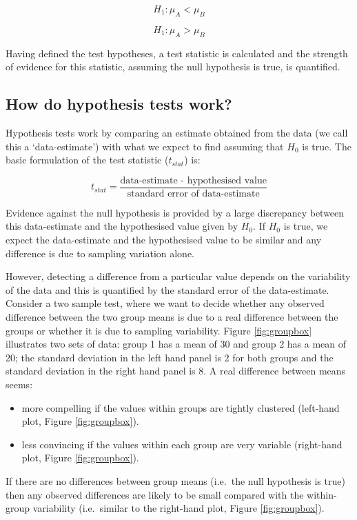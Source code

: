 \documentclass[
  oneside]{krantz}
\begin{document}
\[H_1: \mu_A < \mu_B\]

\[H_1: \mu_A > \mu_B\]

Having defined the test hypotheses, a test statistic is calculated and the strength of evidence for this statistic, assuming the null hypothesis is true, is quantified.

\hypertarget{how-do-hypothesis-tests-work}{%
\subsection{How do hypothesis tests work?}\label{how-do-hypothesis-tests-work}}

Hypothesis tests work by comparing an estimate obtained from the data (we call this a `data-estimate') with what we expect to find assuming that \(H_0\) is true. The basic formulation of the test statistic (\(t_{stat}\)) is:

\[t_{stat}=\frac{\textrm{data-estimate - hypothesised value}}{\textrm{standard error of data-estimate}}\]

Evidence against the null hypothesis is provided by a large discrepancy between this data-estimate and the hypothesised value given by \(H_0\). If \(H_0\) is true, we expect the data-estimate and the hypothesised value to be similar and any difference is due to sampling variation alone.

However, detecting a difference from a particular value depends on the variability of the data and this is quantified by the standard error of the data-estimate. Consider a two sample test, where we want to decide whether any observed difference between the two group means is due to a real difference between the groups or whether it is due to sampling variability. Figure \ref{fig:groupbox} illustrates two sets of data: group 1 has a mean of 30 and group 2 has a mean of 20; the standard deviation in the left hand panel is 2 for both groups and the standard deviation in the right hand panel is 8. A real difference between means seems:

\begin{itemize}
\item
  more compelling if the values within groups are tightly clustered (left-hand plot, Figure \ref{fig:groupbox}).
\item
  less convincing if the values within each group are very variable (right-hand plot, Figure \ref{fig:groupbox}).
\end{itemize}

If there are no differences between group means (i.e.~the null hypothesis is true) then any observed differences are likely to be small compared with the within-group variability (i.e.~similar to the right-hand plot, Figure \ref{fig:groupbox}).
\end{document}
